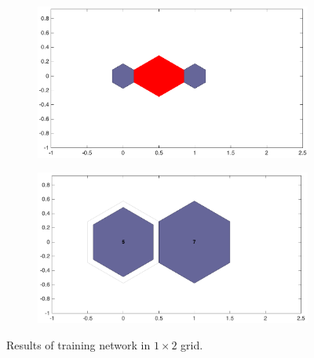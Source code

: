        \begin{figure}
                \begin{subfigure}[b]{0.5\textwidth}
                    \centering
                    \includegraphics[width=\textwidth]{../images/1d/dist_1_by_2.png}
                \end{subfigure}
                \hfill
                \begin{subfigure}[b]{0.5\textwidth}
                     \includegraphics[width=\textwidth]{../images/1d/hit_t_1_by_2.png}
                \end{subfigure}
                \caption{Results of training network in $1\times2$ grid. }
                 \label{fig: 1by2T}
    \end{figure}